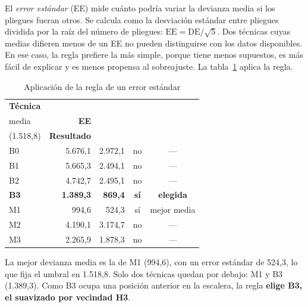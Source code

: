 El \emph{error estándar} (EE) mide cuánto podría variar la devianza media si los pliegues
fueran otros. Se calcula como la desviación estándar entre pliegues dividida por la raíz
del número de pliegues: $\text{EE} = \text{DE} / \sqrt{5}$. Dos técnicas cuyas medias
difieren menos de un EE no pueden distinguirse con los datos disponibles. En ese caso, la
regla prefiere la más simple, porque tiene menos supuestos, es más fácil de explicar y es
menos propensa al sobreajuste. La tabla~\ref{tab:regla-seleccion} aplica la regla.

\begin{table}[H]
  \centering
  \caption{Aplicación de la regla de un error estándar}
  \label{tab:regla-seleccion}
  \interlineadoSimple
  \small
  \begin{tabular}{@{}lrrcc@{}}
    \toprule
    \textbf{Técnica} & \textbf{\celda{Devianza\\media}} & \textbf{EE} & \textbf{\celda{$\leq$ umbral\\(1.518,8)}} & \textbf{Resultado} \\
    \midrule
    B0 & 5.676,1 & 2.972,1 & no & --- \\
    B1 & 5.665,3 & 2.494,1 & no & --- \\
    B2 & 4.742,7 & 2.495,1 & no & --- \\
    \textbf{B3} & \textbf{1.389,3} & \textbf{869,4} & \textbf{sí} & \textbf{elegida} \\
    M1 & 994,6 & 524,3 & sí & mejor media \\
    M2 & 4.190,1 & 3.174,7 & no & --- \\
    M3 & 2.265,9 & 1.878,3 & no & --- \\
    \bottomrule
  \end{tabular}
\end{table}

La mejor devianza media es la de M1 (994,6), con un error estándar de 524,3, lo que fija el
umbral en 1.518,8. Solo dos técnicas quedan por debajo: M1 y B3 (1.389,3). Como B3 ocupa
una posición anterior en la escalera, la regla \textbf{elige B3, el suavizado por vecindad
H3}.

